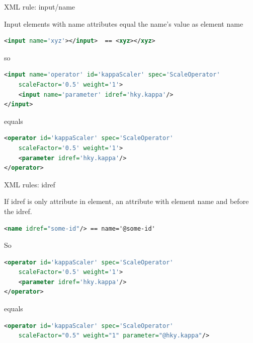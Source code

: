 \documentclass{beamer}
\theoremstyle{definition}
\begin{document}
\begin{frame}[containsverbatim]{XML rule: input/name}

Input elements with name attributes equal the name's value as element name

\begin{lstlisting}[language=XML]
<input name='xyz'></input>  == <xyz></xyz>
\end{lstlisting}

so

{\small
\begin{lstlisting}[language=XML]
<input name='operator' id='kappaScaler' spec='ScaleOperator' 
    scaleFactor='0.5' weight='1'>
    <input name='parameter' idref='hky.kappa'/>
</input>
\end{lstlisting}
}

equals

{\small
\begin{lstlisting}[language=XML]
<operator id='kappaScaler' spec='ScaleOperator' 
    scaleFactor='0.5' weight='1'>
    <parameter idref='hky.kappa'/>
</operator>
\end{lstlisting}
}
\end{frame}


\begin{frame}[containsverbatim]{XML rules: idref}

If idref is only attribute in element, an attribute with element
name and \@ before the idref.

\begin{lstlisting}[language=XML]
<name idref="some-id"/> == name='@some-id'
\end{lstlisting}

So

{\small
\begin{lstlisting}[language=XML]
<operator id='kappaScaler' spec='ScaleOperator' 
    scaleFactor='0.5' weight='1'>
    <parameter idref='hky.kappa'/>
</operator>
\end{lstlisting}
}

equals

{\small
\begin{lstlisting}[language=XML]
<operator id='kappaScaler' spec='ScaleOperator' 
    scaleFactor="0.5" weight="1" parameter="@hky.kappa"/>
\end{lstlisting}
}
\end{frame}
\end{document}
